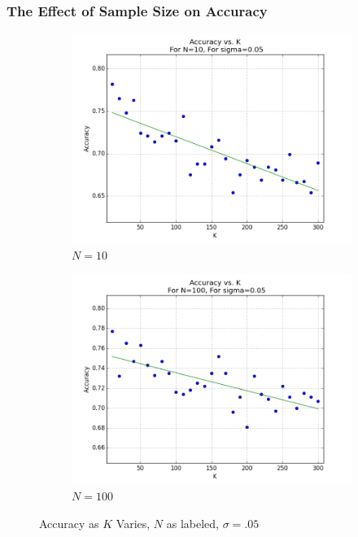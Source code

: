 \documentclass{article}
\begin{document}
\subsubsection{The Effect of Sample Size on Accuracy}
\begin{figure}[H]
    \centering
    \begin{subfigure}[h]{0.75\textwidth}
        \includegraphics[width=\textwidth]{l-experiment1-2-accuracy-k-n-10-s-005.png}
        \caption{$N=10$}
        \label{fig:exp2k1}
    \end{subfigure}
   \begin{subfigure}[h]{0.75\textwidth}
        \includegraphics[width=\textwidth]{l-experiment1-2-accuracy-k-n-100-s-005.png}
        \caption{$N=100$}
        \label{fig:exp2k2}
    \end{subfigure}
    \caption{Accuracy as $K$ Varies, $N$ as labeled, $\sigma=.05$}\label{fig:exp1-2-accuracy-k}
\end{figure}
\end{document}
